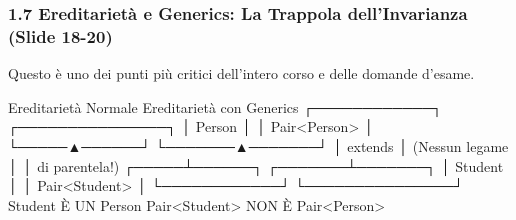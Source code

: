 \documentclass[11pt,a4paper]{article}
\begin{document}
\subsubsection{1.7 Ereditarietà e Generics: La Trappola dell'Invarianza
(Slide
18-20)}\label{ereditarietuxe0-e-generics-la-trappola-dellinvarianza-slide-18-20}

Questo è uno dei punti più critici dell'intero corso e delle domande
d'esame.

\needspace{7cm}
\begin{asciibox}
   Ereditarietà Normale             Ereditarietà con Generics
      ┌────────────┐                     ┌───────────────┐
      │   Person   │                     │ Pair<Person>  │
      └─────▲──────┘                     └───────▲───────┘
            │ extends                            │ (Nessun legame
            │                                    │  di parentela!)
      ┌─────┴──────┐                     ┌───────┴───────┐
      │  Student   │                     │ Pair<Student> │
      └────────────┘                     └───────────────┘
   Student È UN Person             Pair<Student> NON È Pair<Person>
\end{asciibox}
\end{document}

